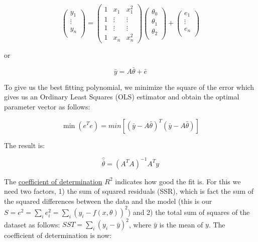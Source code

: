 \documentclass[11pt,letterpaper]{article}
\begin{document}
\begin{equation}\label{Eqn:OLS2}
\begin{pmatrix}
y_1 \\
\vdots \\
y_n \\
\end{pmatrix}
=
\begin{pmatrix}
1 & x_1    & x_1^2\\
1 & \vdots &\vdots \\
1 & \vdots & \vdots\\
1 & x_n    & x_n^2
\end{pmatrix}
\begin{pmatrix}
\theta_0 \\
\theta_1 \\
\theta_2 \\
\end{pmatrix}
+
\begin{pmatrix}
e_1 \\
\vdots \\
e_n \\
\end{pmatrix}
\end{equation}

or

\begin{equation} \label{Eqn:OLS3}
\bar{y} = A \bar{\theta} + \bar{e}
\end{equation}

To give us the best fitting polynomial, we minimize the square of the error which gives us an Ordinary Least Squares (OLS) estimator and obtain the optimal parameter vector as follows:

\begin{equation} \label{Eqn:OLS4}
\min(e^T e) = min\left[ \left( \bar{y} - A \bar{\theta} \right)^T \left( \bar{y} - A \bar{\theta} \right)  \right] 
\end{equation}

The result is:

\begin{equation} \label{Eqn:OLS5}
\hat{\bar{\theta}} = \left(A^TA \right)^{-1} A^T y  
\end{equation}

The \href{http://en.wikipedia.org/wiki/Coefficient_of_determination}{coefficient of determination} $R^2$ indicates how good the fit is. For this we need two factors, 1) the sum of squared residuals (SSR), which is fact the sum of the squared differences between the data and the model (this is our $S = e^2 = \sum_{i}^{} e_i^2  = \sum_{i}^{} \left( y_i - f(x,\theta) \right) ^2$) and 2) the total sum of squares of the dataset as follows: $SST = \sum_{i}^{} \left( y_i - \bar{y} \right) ^2$, where $\bar y$ is the mean of $y$. The coefficient of determination is now:
\end{document}
